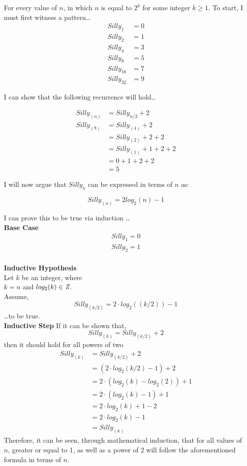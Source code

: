 \documentclass[12pt]{article}
\begin{document}
\begin{answer}
For every value of $n$, in which $n$ is equal to $2^{k}$ for some integer $k \geq 1$. To start, I must first witness a pattern\dots
\begin{align*}
Silly_{1}  &= 0\\
Silly_{2}  &= 1\\
Silly_{4}  &= 3\\
Silly_{8}  &= 5\\
Silly_{16} &= 7\\
Silly_{32} &= 9
\end{align*}

I can show that the following recurrence will hold\dots

\begin{align*}
Silly_{(n)} &= Silly_{n/2} + 2 \\
Silly_{(8)} &= Silly_{(4)} + 2 \\
            &= Silly_{(2)} + 2 + 2 \\
            &= Silly_{(1)} + 1 + 2 + 2 \\
            &= 0 + 1 + 2 + 2 \\
            &= 5
\end{align*}

I will now argue that $Silly_{n}$ can be expressed in terms of $n$ as:

$$ Silly_{(n)} = 2log_{2}(n) - 1$$

I can prove this to be true via induction \dots \\

\textbf{Base Case}
\begin{align*}
    Silly_{1} = 0 \\
    Silly_{2} = 1 \\
\end{align*}

\textbf{Inductive Hypothesis}\\
Let $k$ be an integer, where\\ $k = n$ and $log_{2}(k) \in \emph{Z}$. \\
Assume, 
$$ Silly_{(k/2)} = 2\cdot log_{2} ((k/2)) - 1 $$
\dots to be true.\\
\textbf{Inductive Step}
If it can be shown that, 
$$Silly_{(k)} = Silly_{(k/2)} + 2 $$ then it should hold for all powers of two
\begin{align*}
Silly_{(k)}  &= Silly_{(k/2)} + 2\\
             &= (2\cdot log_{2}(k/2) -1 )+ 2 \\
             &= 2\cdot (log_{2}(k) - log_{2}(2) ) + 1 \\
             &= 2\cdot (log_{2}(k) - 1 ) + 1 \\
             &= 2\cdot log_{2}(k) + 1 - 2 \\
             &= 2\cdot log_{2}(k) - 1 \\
             &= Silly_{(k)}
\end{align*}
Therefore, it can be seen, through mathematical induction, that for all values of $n$, greater or equal to 1, as well as a power of 2 will follow the aforementioned formula in terms of $n$.
\end{answer}
\end{document}
